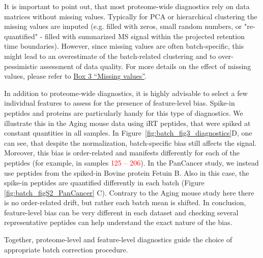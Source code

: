 \documentclass[num-refs]{wiley-article}
\begin{document}
It is important to point out, that most proteome-wide diagnostics rely on data matrices without missing values. Typically for PCA or hierarchical clustering the missing values are imputed (e.g. filled with zeros, small random numbers, or "re-quantified" - filled with summarized MS signal within the projected retention time boundaries). However, since missing values are often batch-specific, this might lead to an overestimate of the batch-related clustering and to over-pessimistic assessment of data quality. For more details on the effect of missing values, please refer to \hyperref[box:Box3_missingness]{Box 3 “Missing values”}.

In addition to proteome-wide diagnostics, it is highly advisable to select a few individual features to assess for the presence of feature-level bias. Spike-in peptides and proteins are particularly handy for this type of diagnostics. We illustrate this in the Aging mouse data using iRT peptides, that were spiked at constant quantities in all samples. In Figure~\ref{fig:batch_fig3_diagnostics}D, one can see, that despite the normalization, batch-specific bias still affects the signal. Moreover, this bias is order-related and manifests differently for each of the peptides (for example, in samples \textcolor{red}{125 – 206}). In the PanCancer study, we instead use peptides from the spiked-in Bovine protein Fetuin B. Also in this case, the spike-in peptides are quantified differently in each batch (Figure \ref{fig:batch_figS2_PanCancer} {C}). Contrary to the Aging mouse study here there is no order-related drift, but rather each batch mean is shifted. In conclusion, feature-level bias can be very different in each dataset and checking several representative peptides can help understand the exact nature of the bias.

Together, proteome-level and feature-level diagnostics guide the choice of appropriate batch correction procedure.
\end{document}
